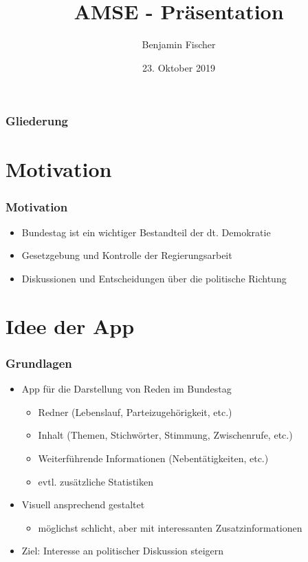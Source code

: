 \documentclass{beamer}
\title{AMSE - Präsentation}
\date{23. Oktober 2019}
\author{Benjamin Fischer}
\institute{benjamin.f.fischer@fau.de}
\begin{document}
  \maketitle

  \begin{frame}
    \frametitle{Gliederung}
    \tableofcontents
  \end{frame}

  \section{Motivation}
  
    \begin{frame}
      \frametitle{Motivation}
      \begin{itemize}
        \item Bundestag ist ein wichtiger Bestandteil der dt. Demokratie
        \item Gesetzgebung und Kontrolle der Regierungsarbeit
        \item<+-> Diskussionen und Entscheidungen über die politische Richtung 
      \end{itemize}
      \centering
    \end{frame}

  
  \section{Idee der App}

    \begin{frame}
      \frametitle{Grundlagen}
      \begin{itemize}
        \item App für die Darstellung von Reden im Bundestag
        \begin{itemize}
          \item Redner (Lebenslauf, Parteizugehörigkeit, etc.)
          \item Inhalt (Themen, Stichwörter, Stimmung, Zwischenrufe, etc.)
          \item Weiterführende Informationen (Nebentätigkeiten, etc.)
          \item evtl. zusätzliche Statistiken
        \end{itemize}
        \item Visuell ansprechend gestaltet
        \begin{itemize}
          \item möglichst schlicht, aber mit interessanten Zusatzinformationen
        \end{itemize}
        \item Ziel: Interesse an politischer Diskussion steigern
      \end{itemize}
    \end{frame}
  
\end{document}
